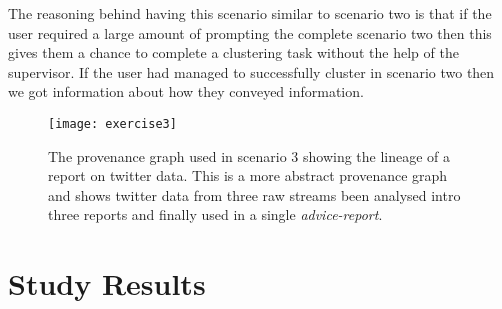 The reasoning behind having this scenario similar to scenario two is that if the user required a large amount of prompting the complete scenario two then this gives them a chance to complete a clustering task without the help of the supervisor. If the user had managed to successfully cluster in scenario two then we got information about how they conveyed information. 

\begin{figure}[h]
	\centering
	\texttt{[image: exercise3]}
	\caption{The provenance graph used in scenario 3 showing the lineage of a report on twitter data. This is a more abstract provenance graph and shows twitter data from three raw streams been analysed intro three reports and finally used in a single \textit{advice-report}.}
	\label{fig:exercise3}
\end{figure}

\section{Study Results}
\label{sec:study_results}

